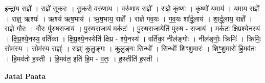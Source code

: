 \documentclass[17pt]{extarticle}
\begin{document}
इन्द्रा॑य॒ राज्ञे᳚ । राज्ञे॑ सूक॒रः । सू॒क॒रो वरु॑णाय । वरु॑णाय॒ राज्ञे᳚ । राज्ञे॒ कृष्णः॑ । कृष्णो॑ य॒माय॑ । य॒माय॒ राज्ञे᳚ । राज्ञ्॒ ऋश्यः॑ । ऋश्य॑ ऋष॒भाय॑ । ऋ॒ष॒भाय॒ राज्ञे᳚ । राज्ञे॑ गव॒यः । ग॒व॒यः शा᳚र्दू॒लाय॑ । शा॒र्दू॒लाय॒ राज्ञे᳚ । राज्ञे॑ गौ॒रः । गौ॒रः पु॑रुषरा॒जाय॑ । पु॒रु॒ष॒रा॒जाय॑ म॒र्कटः॑ । पु॒रु॒ष॒रा॒जायेति॑ पुरुष - रा॒जाय॑ । म॒र्कटः॑ क्षिप्रश्ये॒नस्य॑ । क्षि॒प्र॒श्ये॒नस्य॒ वर्ति॑का । क्षि॒प्र॒श्ये॒नस्येति॑ क्षिप्र - श्ये॒नस्य॑ । वर्ति॑का॒ नील॑ङ्गोः । नील॑ङ्गोः॒ क्रिमिः॑ । क्रिमिः॒ सोम॑स्य । सोम॑स्य॒ राज्ञ्ः॑ । राज्ञ्ः॑ कुलु॒ङ्गः । कु॒लु॒ङ्गः सिन्धो᳚ । सिन्धोः᳚ शिꣳशु॒मारः॑ । शिꣳ॒॒शु॒मारो॑ हि॒मव॑तः । हि॒मव॑तो ह॒स्ती । हि॒मव॑त॒ इति॑ हि॒म - व॒तः॒ । ह॒स्तीति॑ ह॒स्ती । \newline

\textbf{Jatai Paata} \newline
\end{document}
